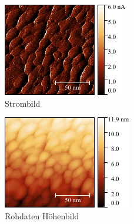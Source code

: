 \documentclass[a4paper,twoside,final]{article}
\begin{document}
\begin{figure}[htp]
    \centering
    \begin{subfigure}{0.3\textwidth}
        \includegraphics[width=\textwidth]{Bilder/Image01963_Strom.pdf}
        \caption{Strombild}
    \end{subfigure}
    \hspace{0.5cm}
    \begin{subfigure}{0.3\textwidth}
        \includegraphics[width=\textwidth]{Bilder/Image01963_Rohdaten.pdf}
        \caption{Rohdaten Höhenbild}
    \end{subfigure}
    \hspace{0.5cm}
    \begin{subfigure}{0.3\textwidth}

\end{subfigure}
\end{figure}
\end{document}
